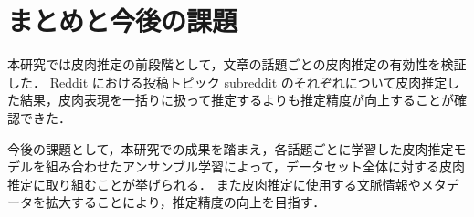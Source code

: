 \newpage
\changeindent{0cm}
\section{まとめと今後の課題}
\changeindent{2cm}

本研究では皮肉推定の前段階として，文章の話題ごとの皮肉推定の有効性を検証した．
Reddit における投稿トピック subreddit のそれぞれについて皮肉推定した結果，皮肉表現を一括りに扱って推定するよりも推定精度が向上することが確認できた．

今後の課題として，本研究での成果を踏まえ，各話題ごとに学習した皮肉推定モデルを組み合わせたアンサンブル学習によって，データセット全体に対する皮肉推定に取り組むことが挙げられる．
また皮肉推定に使用する文脈情報やメタデータを拡大することにより，推定精度の向上を目指す．